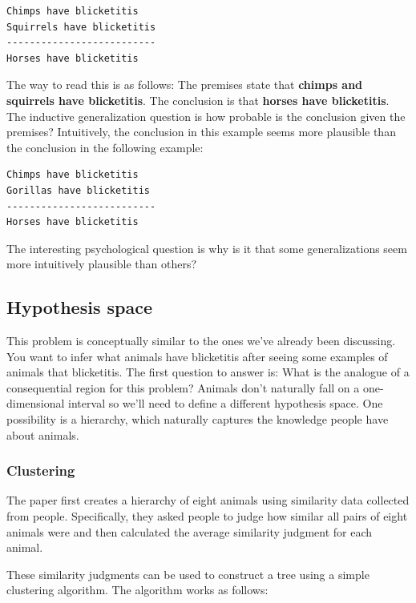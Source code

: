 \documentclass[
  letterpaper,
  DIV=11,
  numbers=noendperiod]{scrreprt}
\begin{document}
\begin{verbatim}
Chimps have blicketitis
Squirrels have blicketitis
--------------------------
Horses have blicketitis
\end{verbatim}

The way to read this is as follows: The premises state that
\textbf{chimps and squirrels have blicketitis}. The conclusion is that
\textbf{horses have blicketitis}. The inductive generalization question
is how probable is the conclusion given the premises? Intuitively, the
conclusion in this example seems more plausible than the conclusion in
the following example:

\begin{verbatim}
Chimps have blicketitis
Gorillas have blicketitis
--------------------------
Horses have blicketitis
\end{verbatim}

The interesting psychological question is why is it that some
generalizations seem more intuitively plausible than others?

\subsection{Hypothesis space}\label{hypothesis-space}

This problem is conceptually similar to the ones we've already been
discussing. You want to infer what animals have blicketitis after seeing
some examples of animals that blicketitis. The first question to answer
is: What is the analogue of a consequential region for this problem?
Animals don't naturally fall on a one-dimensional interval so we'll need
to define a different hypothesis space. One possibility is a hierarchy,
which naturally captures the knowledge people have about animals.

\subsubsection{Clustering}\label{clustering}

The paper first creates a hierarchy of eight animals using similarity
data collected from people. Specifically, they asked people to judge how
similar all pairs of eight animals were and then calculated the average
similarity judgment for each animal.

These similarity judgments can be used to construct a tree using a
simple clustering algorithm. The algorithm works as follows:
\end{document}

